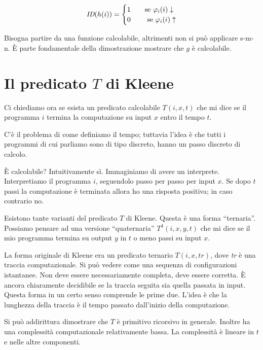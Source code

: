 \begin{equation*}
    \textit{ID}(h(i)) =
    \begin{cases}
        1 \quad &\text{se $\varphi_{i}(i) \downarrow$} \\ 
        0 \quad &\text{ se $\varphi_{i}(i) \uparrow$} \\
    \end{cases}
\end{equation*}

Bisogna partire da una funzione calcolabile, altrimenti non si può applicare s-m-n. È parte
fondamentale della dimostrazione mostrare che $g$ è calcolabile.

\section{Il predicato $T$ di Kleene}

Ci chiediamo ora se esista un predicato calcolabile $T(i,x,t)$ che mi dice se il programma $i$
termina la computazione su input $x$ entro il tempo $t$.

C'è il problema di come definiamo il tempo; tuttavia l'idea è che tutti i programmi di cui
parliamo sono di tipo discreto, hanno un passo discreto di calcolo.

È calcolabile? Intuitivamente sì. Immaginiamo di avere un interprete. Interpretiamo il programma
$i$, seguendolo passo per passo per input $x$. Se dopo $t$ passi la computazione è terminata allora
ho una risposta positiva; in caso contrario no.

Esistono tante varianti del predicato $T$ di Kleene. Questa è una forma ``ternaria''. Possiamo pensare
ad una versione ``quaternaria'' $T^{4}(i,x,y,t)$ che mi dice se il mio programma termina su output
$y$ in $t$ o meno passi su input $x$.

La forma originale di Kleene era un predicato ternario $T(i,x,\textit{tr})$, dove \textit{tr} è una
traccia computazionale. Si può vedere come una sequenza di configurazioni istantanee. Non deve
essere necessariamente completa, deve essere corretta. È ancora chiaramente decidibile se la traccia
seguita sia quella passata in input. Questa forma in un certo senso comprende le prime due. L'idea è
che la lunghezza della traccia è il tempo passato dall'inizio della computazione.

Si può addirittura dimostrare che $T$ è primitivo ricorsivo in generale. Inoltre ha una complessità
computazionale relativamente bassa. La complessità è lineare in $t$ e nelle altre componenti.

